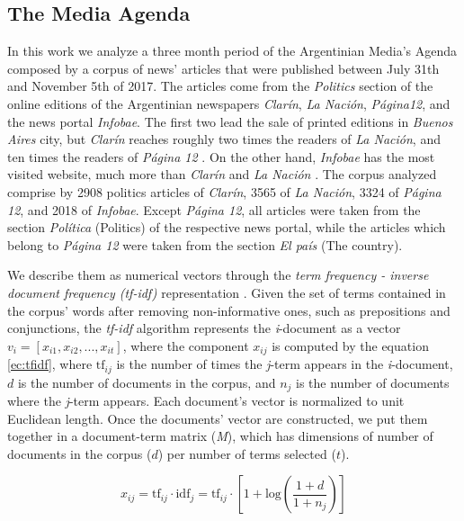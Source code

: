 \documentclass{bmcart}
\begin{document}
\subsection*{The Media Agenda}
\par In this work we analyze a three month period of the Argentinian Media's Agenda composed by a corpus of news' articles that were published between July 31th and November 5th of 2017. 
The articles come from the \emph{Politics} section of the online editions of the Argentinian newspapers \emph{Clar\'in}, \emph{La Naci\'on}, \emph{P\'agina12}, and the news portal \emph{Infobae}. The first two lead the sale of printed editions in \emph{Buenos Aires} city, but \emph{Clar\'in} reaches roughly two times the readers of \emph{La Naci\'on}, and ten times the readers of \emph{P\'agina 12} \cite{IVC}. On the other hand, \emph{Infobae} has the most visited website, much more than \emph{Clar\'in} and \emph{La Naci\'on} \cite{AlexaAR}.
The corpus analyzed comprise by 2908 politics articles of \emph{Clar\'in}, 3565 of \emph{La Naci\'on}, 3324 of \emph{P\'agina 12}, and 2018 of \emph{Infobae}. Except \emph{P\'agina 12}, all articles were taken from the section \emph{Pol\'itica}  (Politics) of the respective news portal, while the articles which belong to \emph{P\'agina 12} were taken from the section \emph{El pa\'is} (The country).

\par We describe them as numerical vectors through the \textit{term frequency - inverse document frequency (tf-idf)} representation \cite{xu2003document}. Given the set of terms contained in the corpus' words after removing non-informative ones, such as prepositions and conjunctions, the \textit{tf-idf} algorithm represents the \textit{i}-document as a vector $v_i = [x_{i1}, x_{i2}, ... , x_{it}]$, where the component $x_{ij}$ is computed by the equation \ref{ec:tfidf}, where $\textrm{tf}_{ij}$ is the number of times the \textit{j}-term appears in the \textit{i}-document, $d$ is the number of documents in the corpus, and $n_j$ is the number of documents where the \textit{j}-term appears. Each document's vector is normalized to unit Euclidean length. Once the documents' vector are constructed, we put them together in a document-term matrix (\emph{M}), which has dimensions of number of documents in the corpus ($d$) per number of terms selected ($t$).

\begin{equation}
x_{ij} = \textrm{tf}_{ij} \cdot \textrm{idf}_{j} = \textrm{tf}_{ij} \cdot [1 + \textrm{log}(\frac{1 + d}{1 + n_j})] 
\label{ec:tfidf}
\end{equation}
\end{document}
